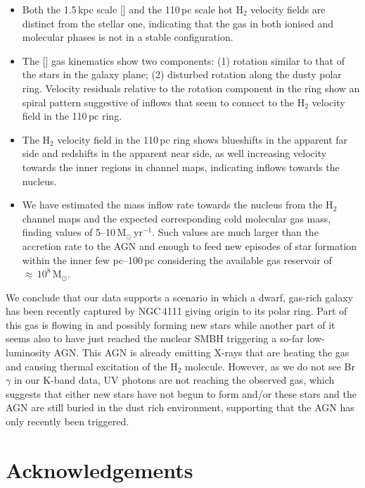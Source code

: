 \documentclass[fleqn,usenatbib]{mnras}
\begin{document}
\begin{itemize}
    
    \item Both the 1.5\,kpc scale [] and the 110\,pc scale hot H$_2$ velocity fields are distinct from the stellar one, indicating that the gas in both ionised and molecular phases is not in a stable configuration. 
    
    \item The [] gas kinematics show two components: (1) rotation similar to that of the stars in the galaxy plane; (2) disturbed rotation along the dusty polar ring. Velocity residuals relative to the rotation component in the ring show an spiral pattern suggestive of inflows that seem to connect to the H$_2$ velocity field in the 110\,pc ring.
    
    \item The H$_2$ velocity field in the 110\,pc ring shows blueshifts in the apparent far side and redshifts in the apparent near side, as well increasing velocity towards the inner regions in channel maps, indicating inflows towards the nucleus.
    
    \item We have estimated the mass inflow rate towards the nucleus from the H$_2$ channel maps and the expected corresponding cold molecular gas mass, finding values of 5--10\,M$_\odot$\,yr$^{-1}$. Such values are much larger than the accretion rate to the AGN and enough to feed new episodes of star formation within the inner few pc--100\,pc considering the available gas reservoir of $\approx\,10^8$\,M$_\odot$.
    
\end{itemize}

We conclude that our data supports a scenario in which a dwarf, gas-rich galaxy has been recently captured by NGC\,4111 giving origin to its polar ring. Part of this gas is flowing in and possibly forming new stars while another part of it seems also to have just reached the nuclear SMBH triggering a so-far low-luminosity AGN. This AGN is already emitting X-rays that are heating the gas and causing thermal excitation of the H$_2$ molecule. However, as we do not see Br$\gamma$ in our K-band data, UV photons are not reaching the observed gas, which suggests that either new stars have not begun to form and/or these stars and the AGN are still buried in the dust rich environment, supporting that the AGN has only recently been triggered.


\section*{Acknowledgements}
\end{document}
